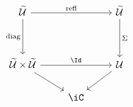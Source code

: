 \[\begin{tikzcd}
	\Tm && \Tm \\
	\\
	{\Tm \times \Tm} && \Ty \\
	& \iC
	\arrow["{\mathrm{refl}}", from=1-1, to=1-3]
	\arrow["\Id", from=3-1, to=3-3]
	\arrow["{\mathrm{diag}}"', from=1-1, to=3-1]
	\arrow["\Sigma", from=1-3, to=3-3]
	\arrow[from=3-1, to=4-2]
	\arrow[from=3-3, to=4-2]
\end{tikzcd}\]